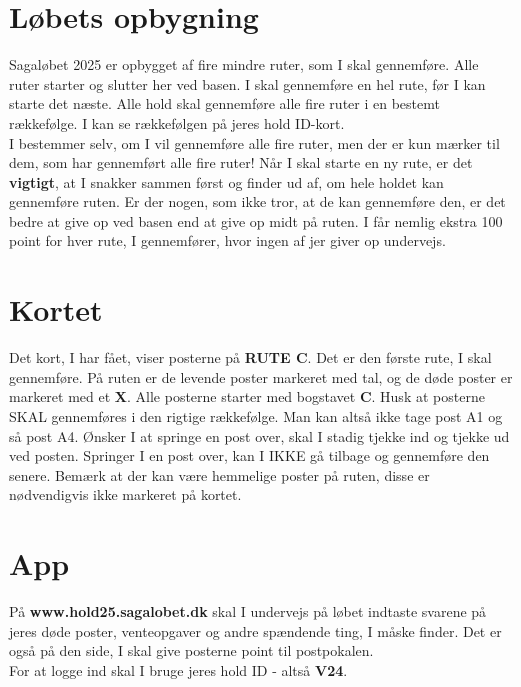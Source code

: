 \section{Løbets opbygning}
Sagaløbet 2025 er opbygget af fire mindre ruter, som I skal gennemføre. Alle ruter starter og slutter her ved basen. I skal gennemføre en hel rute, før I kan starte det næste. Alle hold skal gennemføre alle fire ruter i en bestemt rækkefølge. I kan se rækkefølgen på jeres hold ID-kort.\\\newline
I bestemmer selv, om I vil gennemføre alle fire ruter, men der er kun mærker til dem, som har gennemført alle fire ruter! Når I skal starte en ny rute, er det \textbf{vigtigt}, at I snakker sammen først og finder ud af, om hele holdet kan gennemføre ruten. Er der nogen, som ikke tror, at de kan gennemføre den, er det bedre at give op ved basen end at give op midt på ruten. I får nemlig ekstra 100 point for hver rute, I gennemfører, hvor ingen af jer giver op undervejs.\\
\section{Kortet}
Det kort, I har fået, viser posterne på \textbf{RUTE C}. Det er den første rute, I skal gennemføre. På ruten er de levende poster markeret med tal, og de døde poster er markeret med et \textbf{X}. Alle posterne starter med bogstavet \textbf{C}. Husk at posterne SKAL gennemføres i den rigtige rækkefølge. Man kan altså ikke tage post A1 og så post A4. Ønsker I at springe en post over, skal I stadig tjekke ind og tjekke ud ved posten. Springer I en post over, kan I IKKE gå tilbage og gennemføre den senere. Bemærk at der kan være hemmelige poster på ruten, disse er nødvendigvis ikke markeret på kortet.
\section{App}
På \textbf{www.hold25.sagalobet.dk} skal I undervejs på løbet indtaste svarene på jeres døde poster, venteopgaver og andre spændende ting, I måske finder. Det er også på den side, I skal give posterne point til postpokalen.\\
For at logge ind skal I bruge jeres hold ID - altså \textbf{V24}.
\newpage
